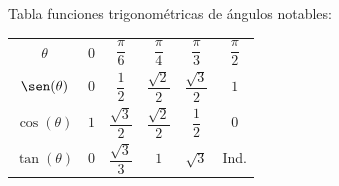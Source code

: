 \documentclass{article}
\begin{document}
Tabla funciones trigonométricas de ángulos notables:
\begin{center}
  \begin{tabular}{|c||c|c|c|c|c|}
    \hline
    \multirow{2}{*}{$\theta$} & \multirow{2}{*}{$0$} & \multirow{2}{*}{$\dfrac{\pi}{6}$} & \multirow{2}{*}{$\dfrac{\pi}{4}$} & \multirow{2}{*}{$\dfrac{\pi}{3}$} & \multirow{2}{*}{$\dfrac{\pi}{2}$}\\
    & & & & & \\
    \hline
    \hline
    \multirow{3}{*}{$\sen(\theta)$} & \multirow{3}{*}{$0$} & \multirow{3}{*}{$\dfrac{1}{2}$} & \multirow{3}{*}{$\dfrac{\sqrt{2}}{2}$} & \multirow{3}{*}{$\dfrac{\sqrt{3}}{2}$} & \multirow{3}{*}{$1$}\\
    & & & & & \\
    & & & & & \\
    \hline
    \multirow{3}{*}{$\cos(\theta)$} & \multirow{3}{*}{$1$} & \multirow{3}{*}{$\dfrac{\sqrt{3}}{2}$} & \multirow{3}{*}{$\dfrac{\sqrt{2}}{2}$} & \multirow{3}{*}{$\dfrac{1}{2}$} & \multirow{3}{*}{$0$}\\
    & & & & & \\
    & & & & & \\
    \hline
    \multirow{3}{*}{$\tan(\theta)$} & \multirow{3}{*}{$0$} & \multirow{3}{*}{$\dfrac{\sqrt{3}}{3}$} & \multirow{3}{*}{$1$} & \multirow{3}{*}{$\sqrt{3}$} & \multirow{3}{*}{Ind.}\\
    & & & & & \\
    & & & & & \\
    \hline
  \end{tabular}
\end{center}
\vspace{2mm}
\end{document}
